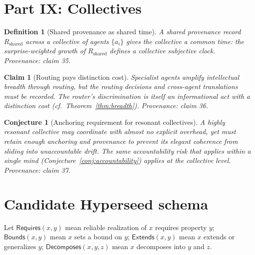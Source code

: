 \documentclass[11pt]{article}
\newtheorem{definition}{Definition}
\newtheorem{claim}{Claim}
\newtheorem{conjecture}{Conjecture}
\begin{document}
\section{Part IX: Collectives}

\begin{definition}[Shared provenance as shared time]
\label{def:sharedtime}
A shared provenance record $R_{\mathrm{shared}}$ across a collective of agents $\{a_i\}$ gives the collective a \emph{common time}: the surprise-weighted growth of $R_{\mathrm{shared}}$ defines a collective subjective clock.
\emph{Provenance: claim 35.}
\end{definition}

\begin{claim}[Routing pays distinction cost]
Specialist agents amplify intellectual breadth through routing, but the routing decisions and cross-agent translations must be recorded. The router's discrimination is itself an informational act with a distinction cost (cf.\ Theorem~\ref{thm:breadth}).
\emph{Provenance: claim 36.}
\end{claim}

\begin{conjecture}[Anchoring requirement for resonant collectives]
A highly resonant collective may coordinate with almost no explicit overhead, yet must retain enough anchoring and provenance to prevent its elegant coherence from sliding into unaccountable drift. The same accountability risk that applies within a single mind (Conjecture~\ref{conj:accountability}) applies at the collective level.
\emph{Provenance: claim 37.}
\end{conjecture}

\section{Candidate Hyperseed schema}

Let $\mathsf{Requires}(x,y)$ mean reliable realization of $x$ requires property $y$; $\mathsf{Bounds}(x,y)$ mean $x$ sets a bound on $y$; $\mathsf{Extends}(x,y)$ mean $x$ extends or generalizes $y$; $\mathsf{Decomposes}(x,y,z)$ mean $x$ decomposes into $y$ and $z$.
\end{document}
